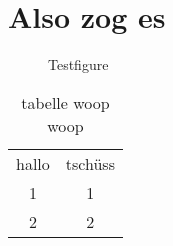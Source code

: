 \chapter{Also zog es}

\lipsum[10]
\begin{figure}
	\caption{Testfigure}
	\label{fig:test}
\end{figure}

\begin{table}
	\caption{tabelle woop woop}
	\label{tb:one}
	\begin{tabular}{cc}
		hallo & tschüss \\
		1 & 1 \\
		2 & 2 \\
	\end{tabular}
\end{table}
\lipsum[50-65]